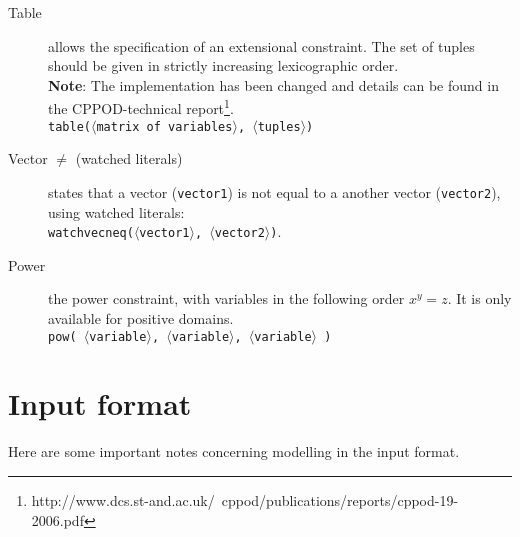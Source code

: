 \documentclass{article}
\begin{document}
\begin{small}
\begin{description}
\item[Table] allows the specification of an extensional constraint. 
The set of tuples should be given in strictly increasing lexicographic order.\\
\textbf{Note}: The implementation has been changed and details can be found in the CPPOD-technical
report\footnote{http://www.dcs.st-and.ac.uk/~cppod/publications/reports/cppod-19-2006.pdf}.\\
\texttt{table($\langle$matrix of variables$\rangle$, $\langle$tuples$\rangle$)}

\item[Vector $ \mathbf{\neq}$ (watched literals)] states that a vector (\texttt{vector1}) is not
equal to a another vector (\texttt{vector2}), using watched literals:\\
\texttt{watchvecneq($\langle$vector1$\rangle$, $\langle$vector2$\rangle$)}.

\item[Power] the power constraint, with variables in the following order $x^y = z$. It is only available for positive domains.\\
\texttt{pow( $\langle$variable$\rangle$,  $\langle$variable$\rangle$,  $\langle$variable$\rangle$ ) }

\end{description}



\clearpage
\section{Input format}\label{sect_input}





Here are some important notes concerning modelling in the input format.

\begin{description}


\end{description}
\end{small}
\end{document}
